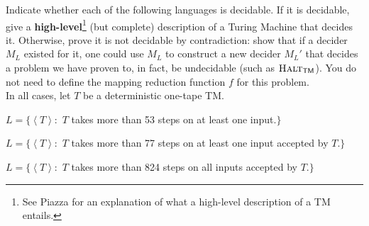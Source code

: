 \documentclass[solution, letterpaper]{cs121}
\begin{document}



Indicate whether each of the following languages is decidable. If it is
decidable, give a \textbf{high-level}\footnote{See Piazza for an explanation of
what a high-level description of a TM entails.} (but complete) description of
a Turing Machine that decides it. Otherwise, prove it is not decidable by
contradiction: show that if a decider $M_L$ existed for it, one could use $M_L$
to construct a new decider $M_L'$ that decides a problem we have proven to, in
fact, be undecidable (such as $\textsc{Halt}_{\textsf{TM}}$). You do not need
to define the mapping reduction function $f$ for this problem.\\

\noindent In all cases, let $T$ be a deterministic one-tape TM.
 
\subproblem $L=\{\left<T\right>:$ $T$ takes more than 53 steps on at least one
input.$\}$ 

\subproblem $L=\{\left<T\right>:$ $T$ takes more than 77 steps on at least one
input accepted by $T$.$\}$

\subproblem $L=\{\left<T\right>:$ $T$ takes more than 824 steps on all inputs
accepted by $T$.$\}$
\end{document}
